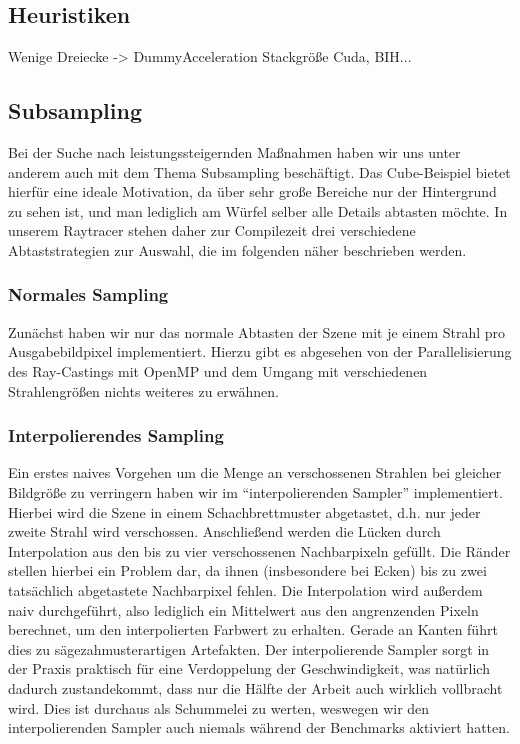 \subsection{Heuristiken}
Wenige Dreiecke -> DummyAcceleration
Stackgröße Cuda, BIH...

\subsection{Subsampling}
Bei der Suche nach leistungssteigernden Maßnahmen haben wir uns unter anderem auch mit dem Thema Subsampling beschäftigt.
Das Cube-Beispiel bietet hierfür eine ideale Motivation, da über sehr große Bereiche nur der Hintergrund zu sehen ist, und man lediglich am Würfel selber alle Details abtasten möchte.
In unserem Raytracer stehen daher zur Compilezeit drei verschiedene Abtaststrategien zur Auswahl, die im folgenden näher beschrieben werden.

\subsubsection{Normales Sampling}
Zunächst haben wir nur das normale Abtasten der Szene mit je einem Strahl pro Ausgabebildpixel implementiert.
Hierzu gibt es abgesehen von der Parallelisierung des Ray-Castings mit OpenMP und dem Umgang mit verschiedenen Strahlengrößen nichts weiteres zu erwähnen.

\subsubsection{Interpolierendes Sampling}
Ein erstes naives Vorgehen um die Menge an verschossenen Strahlen bei gleicher Bildgröße zu verringern haben wir im "`interpolierenden Sampler"' implementiert.
Hierbei wird die Szene in einem Schachbrettmuster abgetastet, d.h. nur jeder zweite Strahl wird verschossen.
Anschließend werden die Lücken durch Interpolation aus den bis zu vier verschossenen Nachbarpixeln gefüllt.
Die Ränder stellen hierbei ein Problem dar, da ihnen (insbesondere bei Ecken) bis zu zwei tatsächlich abgetastete Nachbarpixel fehlen.
Die Interpolation wird außerdem naiv durchgeführt, also lediglich ein Mittelwert aus den angrenzenden Pixeln berechnet, um den interpolierten Farbwert zu erhalten.
Gerade an Kanten führt dies zu sägezahmusterartigen Artefakten.
Der interpolierende Sampler sorgt in der Praxis praktisch für eine Verdoppelung der Geschwindigkeit, was natürlich dadurch zustandekommt, dass nur die Hälfte der Arbeit auch wirklich vollbracht wird.
Dies ist durchaus als Schummelei zu werten, weswegen wir den interpolierenden Sampler auch niemals während der Benchmarks aktiviert hatten.

